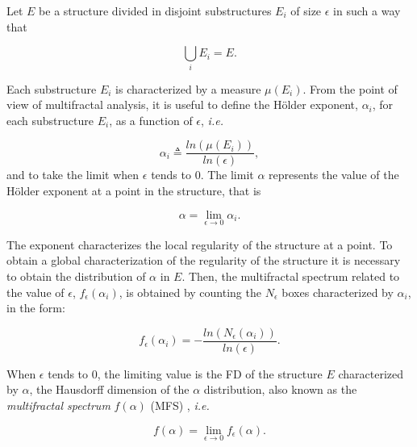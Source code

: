 
Let $E$ be a structure divided in disjoint substructures $E_{i}$ of size $\epsilon$ in such a way that 

\begin{equation}
\displaystyle\bigcup_{i}E_{i} = E.
\end{equation}

Each substructure $E_{i}$ is characterized by a measure $\mu(E_{i})$. From the point of view of multifractal analysis, it is useful to define the H\"older exponent, $\alpha_{i}$, for each substructure $E_{i}$, as a function of $\epsilon$, {\em i.e.}


\begin{equation}
\alpha_{i} \triangleq \frac{ln(\mu(E_{i}))}{ln(\epsilon)},
\label{eqn:eqn4}
\end{equation}
\noindent
and to take the limit when $\epsilon$ tends to $0$. The limit $\alpha$ represents the value of the H\"older exponent at a point in the structure, that is

\begin{equation}
\alpha = \lim_{\epsilon\to0}{\alpha_{i}}.
\label{eqn:eqn5}
\end{equation}

The exponent characterizes the local regularity of the structure at a point. To obtain a global characterization of the regularity of the structure it is necessary to obtain the distribution of $\alpha$ in $E$. Then, the multifractal spectrum related to the value of $\epsilon$, $f_{\epsilon}(\alpha_{i})$, is obtained by counting the $N_{\epsilon}$ boxes characterized by $\alpha_{i}$, in the form:

\begin{equation}
f_{\epsilon}(\alpha_{i}) = - \frac{ln(N_{\epsilon}(\alpha_{i}))}{ln(\epsilon)}.
\label{eqn:eqn6}
\end{equation}

When $\epsilon$ tends to $0$, the limiting value is the FD of the structure $E$ characterized by $\alpha$, the Hausdorff dimension of the $\alpha$ distribution, also known as the {\em multifractal spectrum} $f(\alpha)$ (MFS) \cite{Silvetti2010}, {\em i.e.}

\begin{equation}
f(\alpha) = \lim_{\epsilon\to0}{f_{\epsilon}(\alpha)}.
\label{eqn:eqn7}
\end{equation}

